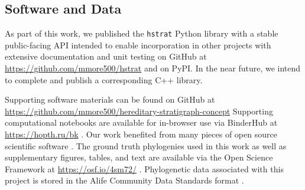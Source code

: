 \subsection{Software and Data}


As part of this work, we published the \texttt{hstrat} Python library with a stable public-facing API intended to enable incorporation in other projects with extensive documentation and unit testing on GitHub at \url{https://github.com/mmore500/hstrat} and on PyPI.%
In the near future, we intend to complete and publish a corresponding C++ library.

Supporting software materials can be found on GitHub at \url{https://github.com/mmore500/hereditary-stratigraph-concept}
Supporting computational notebooks are available for in-browser use via BinderHub at \url{https://hopth.ru/bk} \citep{ragan2018binder}.
Our work benefited from many pieces of open source scientific software \citep{sukumaran2010dendropy,virtanen2020scipy,hunter2007matplotlib,virtanen2020scipy,waskom2021seaborn,bostock2011d3,meurer2017sympy,smith2020treedistdata,paradis2004ape,ushey2022reticulate,wickham2022dplyr}.
The ground truth phylogenies used in this work as well as supplementary figures, tables, and text are available via the Open Science Framework at
\url{https://osf.io/4sm72/} \citep{foster2017open,moreno2022hstratconceptsupplement}.
Phylogenetic data associated with this project is stored in the Alife Community Data Standards format \citep{lalejini2019data}.
